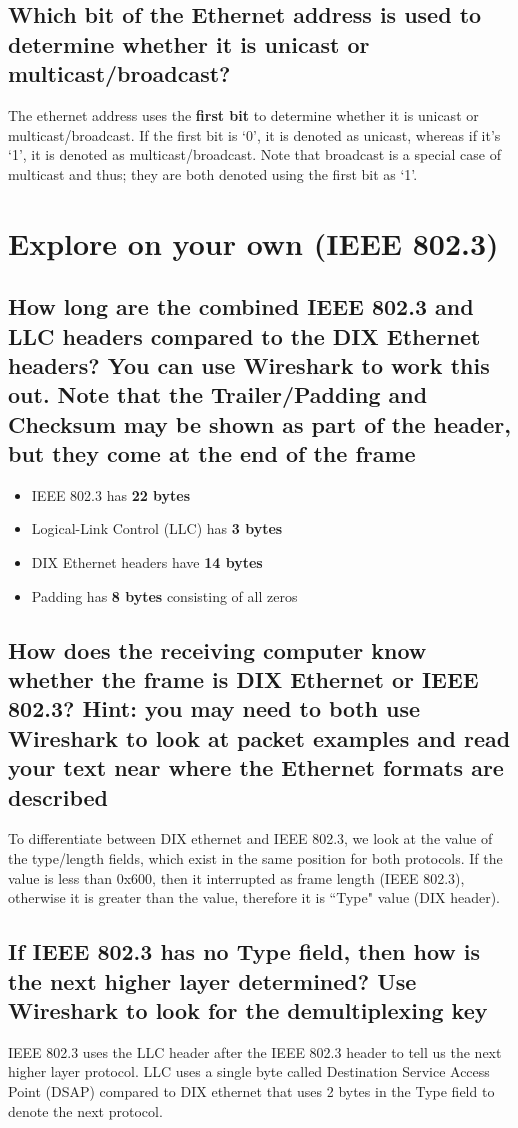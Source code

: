 \documentclass{article}
\begin{document}
    \subsection*{Which bit of the Ethernet address is used to determine whether it is unicast or multicast/broadcast?}
    The ethernet address uses the {\bfseries first bit} to determine whether it is unicast or multicast/broadcast.
    If the first bit is `0', it is denoted as unicast, whereas if it's `1', it is denoted as multicast/broadcast. 
    Note that broadcast is a special case of multicast and thus; they are both denoted using the first bit as `1'.
    \section*{Explore on your own (IEEE 802.3)}
    \subsection*{How long are the combined IEEE 802.3 and LLC headers compared to the DIX Ethernet headers?
    You can use Wireshark to work this out. Note that the Trailer/Padding and Checksum may be shown as part of the header, but they come at the end of the frame}
    \begin{itemize}
        \item IEEE 802.3 has {\bfseries 22 bytes}
        \item Logical-Link Control (LLC) has {\bfseries 3 bytes}
        \item DIX Ethernet headers have {\bfseries 14 bytes}
        \item Padding has {\bfseries 8 bytes} consisting of all zeros
    \end{itemize}
    \subsection*{How does the receiving computer know whether the frame is DIX Ethernet or IEEE 802.3? Hint: you may need to both use Wireshark to look at packet examples and read your text near where the Ethernet formats are described}
    To differentiate between DIX ethernet and IEEE 802.3, we look at the value of the type/length fields, which exist in the same position for both protocols.
    If the value is less than 0x600, then it interrupted as frame length (IEEE 802.3), otherwise it is greater than the value, therefore it is ``Type" value (DIX header).
    \subsection*{If IEEE 802.3 has no Type field, then how is the next higher layer determined? Use Wireshark to look for the demultiplexing key}
    IEEE 802.3 uses the LLC header after the IEEE 802.3 header to tell us the next higher layer protocol.
    LLC uses a single byte called Destination Service Access Point (DSAP) compared to DIX ethernet that uses 2 bytes in the Type field to denote the next protocol.
\end{document}
